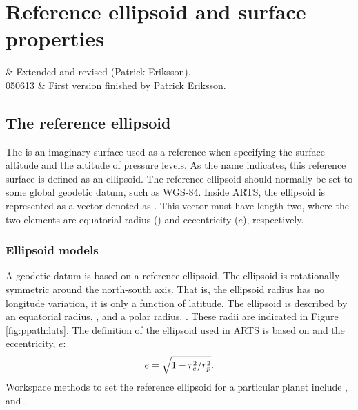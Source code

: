 \chapter{Reference ellipsoid and surface properties}
 \label{sec:surface}


 & Extended and revised (Patrick Eriksson). \\
  050613 & First version finished by Patrick Eriksson. \\
\stophistory


\graphicspath{{Figs/ppath/}{Figs/rte/}}


\section{The reference ellipsoid}
\label{sec:fm_defs:geoid}

The  is an imaginary surface used as a reference when
specifying the surface altitude and the altitude of pressure levels. As the
name indicates, this reference surface is defined as an ellipsoid. The
reference ellipsoid should normally be set to some global geodetic datum, such
as WGS-84.
Inside ARTS, the ellipsoid is represented as a vector denoted as
. This vector must have length two, where the two
elements are equatorial radius () and eccentricity ($e$), respectively.




\subsection{Ellipsoid models}
\label{sec:ppath:geoid}

A geodetic datum is based on a reference ellipsoid. The ellipsoid is
rotationally symmetric around the north-south axis. That is, the ellipsoid
radius has no longitude variation, it is only a function of latitude. The
ellipsoid is described by an equatorial radius, , and a polar radius,
. These radii are indicated in Figure \ref{fig:ppath:lats}. The
definition of the ellipsoid used in ARTS is based on  and the
eccentricity, $e$:
\begin{equation}
 e = \sqrt{1-r_{e}^2/r_{p}^2}.
 \label{eq:ppath:eccentricity} 
\end{equation}
Workspace methods to set the reference ellipsoid for a particular planet
include ,  and
. 

